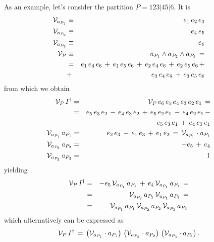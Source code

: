 \documentclass[twocolumn,aps,sort,nofootinbib]{revtex4}
\begin{document}
As an example, let's consider the partition $P=123|45|6$. It is 
\begin{eqnarray*}
{\cal V}_{a_{P_1}}&\equiv & e_1\,e_2\,e_3 \\
{\cal V}_{a_{P_2}}&\equiv & e_4\,e_5 \\
{\cal V}_{a_{P_3}}&\equiv & e_6 \\
{\cal V}_P        &\equiv & a_{P_1} \wedge a_{P_2} \wedge a_{P_3} \,=\\
                  & = & e_1\,e_4\,e_6\,+\,e_1\,e_5\,e_6\,+\,e_2\,e_4\,e_6\,+\,e_2\,e_5\,e_6\,+\\
                  & + & e_3\,e_4\,e_6\,+\,e_3\,e_5\,e_6
\end{eqnarray*}
from which we obtain
\begin{eqnarray*}
{\cal V}_P\,I^\dagger & = & {\cal V}_P\,e_6\,e_5\,e_4\,e_3\,e_2\,e_1\,= \\
                       & = & e_5\,e_3\,e_2\,-\,e_4\,e_3\,e_2\,+\,e_5\,e_2\,e_1\,-\,e_4\,e_2\,e_1\,-\\
                       & - & e_5\,e_3\,e_1\,+\,e_4\,e_3\,e_1 \\
{\cal V}_{a_{P_1}}\,a_{P_1} & = & e_2\,e_3\,-\,e_1\,e_3\,+\,e_1\,e_2 \,=\,
{\cal V}_{a_{P_1}}\cdot a_{P_1} \\
{\cal V}_{a_{P_2}}\,a_{P_2} & = & -e_5\,+\,e_4 \\
{\cal V}_{a_{P_3}}\,a_{P_3} & = & 1 
\end{eqnarray*}
yielding
\begin{eqnarray*}
{\cal V}_P\,I^\dagger 
& = & -e_5\,{\cal V}_{a_{P_1}}\,a_{P_1}\,+\,e_4\,{\cal V}_{a_{P_1}}\,a_{P_1}\,=\\
& = & {\cal V}_{a_{P_2}}\,a_{P_2} \, {\cal V}_{a_{P_1}}\,a_{P_1} \,=\\
& = & {\cal V}_{a_{P_1}}\,a_{P_1} \, {\cal V}_{a_{P_2}}\,a_{P_2} \, {\cal V}_{a_{P_3}}\,a_{P_3} \,
\end{eqnarray*}
which alternatively can be expressed as 
\begin{equation*}
{\cal V}_P\,I^\dagger \,=\, \left({\cal V}_{a_{P_1}}\cdot a_{P_1}\right)\,
      \left({\cal V}_{a_{P_2}}\cdot a_{P_2}\right)\,
      \left({\cal V}_{a_{P_3}}\cdot a_{P_3}\right).
\end{equation*}
\end{document}
